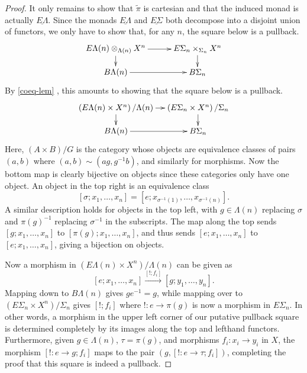 \begin{proof}
It only remains to show that $\tilde{\pi}$ is cartesian and that the induced monad is actually $\underline{E\Lambda}$. Since the monads $\underline{E\Lambda}$ and $\underline{E\Sigma}$ both decompose into a disjoint union of functors, we only have to show that, for any $n$, the square below is a pullback.
  \[
    \xy
      (0,0)*+{\coeq{E\Lambda}{X}{\Lambda}{n}} ="00";
      (0,-10)*+{B\Lambda(n)} ="01";
      (35,0)*+{E\Sigma_{n} \times_{\Sigma_{n}} X^n} ="10";
      (35,-10)*+{B\Sigma_{n}} ="11";
      {\ar^{} "00" ; "10"};
      {\ar^{} "10" ; "11"};
      {\ar^{} "00" ; "01"};
      {\ar^{} "01" ; "11"};
    \endxy
  \]
By \cref{coeq-lem}
, this amounts to showing that the square below is a pullback.
  \[
    \xy
      (0,0)*+{\left(E\Lambda(n) \times X^n\right)/\Lambda(n)} ="00";
      (0,-10)*+{B\Lambda(n)} ="01";
      (35,0)*+{\left(E\Sigma_{n} \times X^n\right)/\Sigma_{n}} ="10";
      (35,-10)*+{B\Sigma_{n}} ="11";
      {\ar^{} "00" ; "10"};
      {\ar^{} "10" ; "11"};
      {\ar^{} "00" ; "01"};
      {\ar^{} "01" ; "11"};
    \endxy
  \]
Here, $(A \times B)/G$ is the category whose objects are equivalence classes of pairs $(a,b)$ where $(a,b) \sim (ag, g^{-1}b)$, and similarly for morphisms. Now the bottom map is clearly bijective on objects since these categories only have one object. An object in the top right is an equivalence class
  \[
    [\sigma; x_{1}, \ldots, x_{n}] = \left[e; x_{\sigma^{-1}(1)}, \ldots, x_{\sigma^{-1}(n)}\right].
  \]
A similar description holds for objects in the top left, with $g \in \Lambda(n)$ replacing $\sigma$ and $\pi(g)^{-1}$ replacing $\sigma^{-1}$ in the subscripts. The map along the top sends $[g; x_{1}, \ldots, x_{n}]$ to $[\pi(g); x_{1}, \ldots, x_{n}]$, and thus sends $[e; x_{1}, \ldots, x_{n}]$ to $[e; x_{1}, \ldots, x_{n}]$, giving a bijection on objects.

Now a morphism in $(E\Lambda(n) \times X^{n})/\Lambda(n)$ can be given as
  \[
    [e; x_{1}, \ldots, x_{n}] \stackrel{[!; f_{i}]}{\longrightarrow} [g; y_{1}, \ldots, y_{n}].
  \]
Mapping down to $B\Lambda(n)$ gives $ge^{-1} = g$, while mapping over to $(E\Sigma_{n} \times X^{n})/\Sigma_{n}$ gives $[!; f_{i}]$ where $! \colon e \rightarrow \pi(g)$ is now a morphism in $E\Sigma_{n}$. In other words, a morphism in the upper left corner of our putative pullback square is determined completely by its images along the top and lefthand functors. Furthermore, given $g \in \Lambda(n)$, $\tau = \pi(g)$, and morphisms $f_{i} \colon x_{i} \rightarrow y_{i}$ in $X$, the morphism $[! \colon e \rightarrow g; f_{i}]$ maps to the pair $(g, [! \colon e \rightarrow \tau; f_{i}])$, completing the proof that this square is indeed a pullback.
\end{proof}

